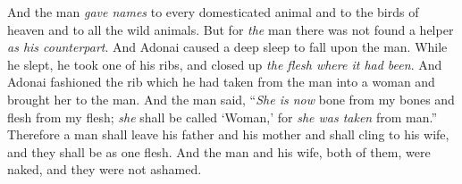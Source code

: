 \begin{biblechapter}
\verse And the man \textit{gave names} to every domesticated animal and to the birds of heaven and to all the wild animals. But for \textit{the} man there was not found a helper \textit{as his counterpart}.
\verse And Adonai caused a deep sleep to fall upon the man. While he slept, he took one of his ribs, and closed up \textit{the flesh where it had been}.
\verse And Adonai fashioned the rib which he had taken from the man into a woman and brought her to the man.
\verse And the man said, “\textit{She is now} bone from my bones 
and flesh from my flesh; 
\textit{she} shall be called ‘Woman,’ 
for \textit{she was taken} from man.”
\verse Therefore a man shall leave his father and his mother and shall cling to his wife, and they shall be as one flesh.
\verse And the man and his wife, both of them, were naked, and they were not ashamed.
\end{biblechapter}

